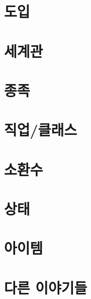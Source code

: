 \documentclass{report}
\begin{document}
	\setcounter{parttocdepth}{3}
	\parttoc
	\setcounter{parttocdepth}{1}
	
	\chapter{도입}
		
	
	\chapter{세계관}
		
	
	\chapter{종족}
		
	
	\chapter{직업/클래스}
		
	
	\chapter{소환수}
		
	
	\chapter{상태}
		
	
	\chapter{아이템}
		
	
	\chapter{다른 이야기들}
		
\end{document}
